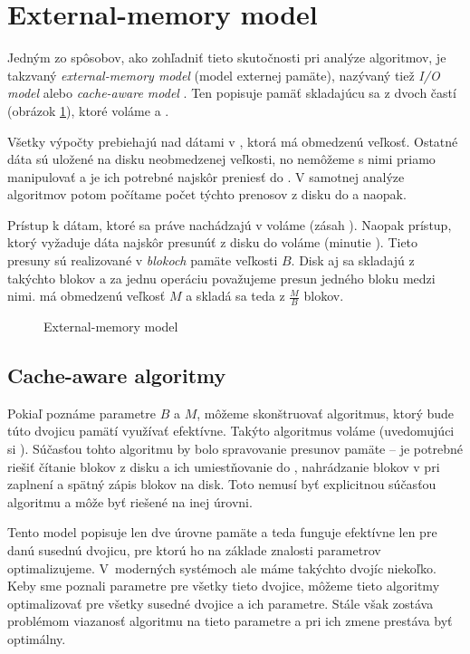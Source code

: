 \section{External-memory model} \label{sec:extmem}
Jedným zo spôsobov, ako zohľadniť tieto skutočnosti pri analýze algoritmov, je takzvaný \emph{external-memory model} (model externej pamäte), nazývaný tiež \emph{I/O model} alebo \emph{cache-aware model} \citep{aggarwal1988input}. Ten popisuje pamäť skladajúcu sa z dvoch častí (obrázok \ref{fig:exmem_model}), ktoré voláme \cache a \disk.

Všetky výpočty prebiehajú nad dátami v \cache, ktorá má obmedzenú veľkosť. Ostatné dáta sú uložené na disku neobmedzenej veľkosti, no nemôžeme s nimi priamo manipulovať a je ich potrebné najskôr preniesť do \cache. V samotnej analýze algoritmov potom počítame počet týchto prenosov z disku do \cache a naopak.

Prístup k dátam, ktoré sa práve nachádzajú v \cache voláme \hit (zásah \cache). Naopak prístup, ktorý vyžaduje dáta najskôr presunúť z disku do \cache voláme \miss (minutie \cache). Tieto presuny sú realizované v \emph{blokoch} pamäte veľkosti $B$. Disk aj \cache sa skladajú z takýchto blokov a za jednu operáciu považujeme presun jedného bloku medzi nimi. \Cache má obmedzenú veľkosť $M$ a skladá sa teda z $\frac{M}{B}$ blokov.  

\begin{figure}
    \centering
    \resizebox{0.8\textwidth}{!}{%
            
    }
    \caption{External-memory model}
    \label{fig:exmem_model}
\end{figure}

\subsection{Cache-aware algoritmy}
Pokiaľ poznáme parametre $B$ a $M$, môžeme skonštruovať algoritmus, ktorý bude túto dvojicu pamätí využívať efektívne. Takýto algoritmus voláme \aware (uvedomujúci si \cache). Súčasťou tohto algoritmu by bolo spravovanie presunov pamäte -- je potrebné riešiť čítanie blokov z disku a ich umiestňovanie do \cache, nahrádzanie blokov v \cache pri zaplnení a spätný zápis blokov na disk. Toto nemusí byť explicitnou súčasťou algoritmu a môže byť riešené na inej úrovni.


Tento model popisuje len dve úrovne pamäte a teda funguje efektívne len pre danú susednú dvojicu, pre ktorú ho na základe znalosti parametrov optimalizujeme. V~moderných systémoch ale máme takýchto dvojíc niekoľko. Keby sme poznali parametre pre všetky tieto dvojice, môžeme tieto algoritmy optimalizovať pre všetky susedné dvojice a ich parametre. Stále však zostáva problémom viazanosť algoritmu na tieto parametre a pri ich zmene prestáva byť optimálny.



